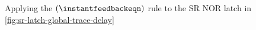 \begin{figure}
    \centering
    \caption{
        Applying the \((\instantfeedbackeqn)\) rule to the SR NOR latch in
        \cref{fig:sr-latch-global-trace-delay}
    }
    \label{fig:sr-latch-unrolled}
\end{figure}